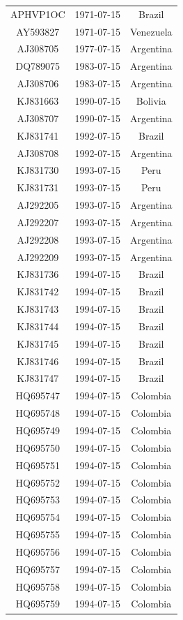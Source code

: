 \documentclass[a4paper,10pt]{article}
\begin{document}
\begin{center}
\begin{longtable}{ccc}
\hline \hline
\endlastfoot
APHVP1OC & 1971-07-15 & Brazil \\
AY593827 & 1971-07-15 & Venezuela \\
AJ308705 & 1977-07-15 & Argentina \\
DQ789075 & 1983-07-15 & Argentina \\
AJ308706 & 1983-07-15 & Argentina \\
KJ831663 & 1990-07-15 & Bolivia \\
AJ308707 & 1990-07-15 & Argentina \\
KJ831741 & 1992-07-15 & Brazil \\
AJ308708 & 1992-07-15 & Argentina \\
KJ831730 & 1993-07-15 & Peru \\
KJ831731 & 1993-07-15 & Peru \\
AJ292205 & 1993-07-15 & Argentina \\
AJ292207 & 1993-07-15 & Argentina \\
AJ292208 & 1993-07-15 & Argentina \\
AJ292209 & 1993-07-15 & Argentina \\
KJ831736 & 1994-07-15 & Brazil \\
KJ831742 & 1994-07-15 & Brazil \\
KJ831743 & 1994-07-15 & Brazil \\
KJ831744 & 1994-07-15 & Brazil \\
KJ831745 & 1994-07-15 & Brazil \\
KJ831746 & 1994-07-15 & Brazil \\
KJ831747 & 1994-07-15 & Brazil \\
HQ695747 & 1994-07-15 & Colombia \\
HQ695748 & 1994-07-15 & Colombia \\
HQ695749 & 1994-07-15 & Colombia \\
HQ695750 & 1994-07-15 & Colombia \\
HQ695751 & 1994-07-15 & Colombia \\
HQ695752 & 1994-07-15 & Colombia \\
HQ695753 & 1994-07-15 & Colombia \\
HQ695754 & 1994-07-15 & Colombia \\
HQ695755 & 1994-07-15 & Colombia \\
HQ695756 & 1994-07-15 & Colombia \\
HQ695757 & 1994-07-15 & Colombia \\
HQ695758 & 1994-07-15 & Colombia \\
HQ695759 & 1994-07-15 & Colombia \\

\end{longtable}
\end{center}
\end{document}
